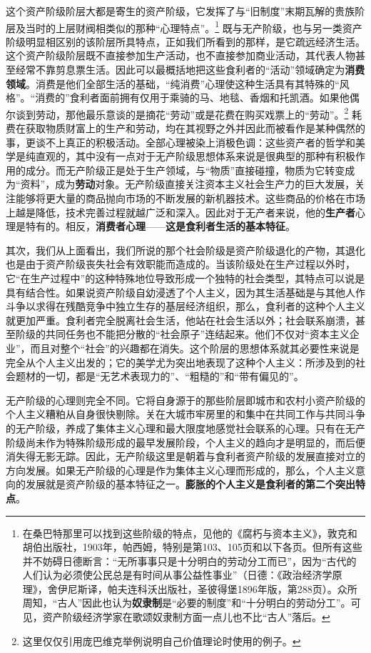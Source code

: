 \documentclass[fontset=fandol, a4paper, 12pt, openright]{ctexbook}
\begin{document}
这个资产阶级阶层大都是寄生的资产阶级，它发挥了与“旧制度”末期瓦解的贵族阶层及当时的上层财阀相类似的那种“心理特点”。\footnote{在桑巴特那里可以找到这些阶级的特点，见他的《腐朽与资本主义》，敦克和胡伯出版社，1903年，帕西姆，特别是第103、105页和以下各页。但所有这些并不妨碍日德断言：“无所事事只是十分明白的劳动分工而已”，因为“古代的人们认为必须使公民总是有时间从事公益性事业”（日德：《政治经济学原理》，舍伊尼斯译，帕夫连科沃出版社，圣彼得堡1896年版，第288页）。众所周知，“古人”因此也认为\textbf{奴隶制}是“必要的制度”和“十分明白的劳动分工”。可见，资产阶级经济学家在歌颂奴隶制方面一点儿也不比“古人”落后。} 既与无产阶级，也与另一类资产阶级明显相区别的该阶层所具特点，正如我们所看到的那样，是它疏远经济生活。这个资产阶级阶层既不直接参加生产活动，也不直接参加商业活动，其代表人物甚至经常不靠剪息票生活。因此可以最概括地把这些食利者的“活动”领域确定为\textbf{消费领域}。消费是他们全部生活的基础，“纯消费”心理使这种生活具有其特殊的“风格”。“消费的”食利者面前拥有仅用于乘骑的马、地毯、香烟和托凯酒。如果他偶尔谈到劳动，那他最乐意谈的是摘花“劳动”或是花费在购买戏票上的“劳动”。\footnote{这里仅仅引用庞巴维克举例说明自己价值理论时使用的例子。} 耗费在获取物质财富上的生产和劳动，均在其视野之外并因此而被看作是某种偶然的事，更谈不上真正的积极活动。全部心理被染上消极色调：这些资产者的哲学和美学是纯直观的，其中没有一点对于无产阶级思想体系来说是很典型的那种有积极作用的成分。而无产阶级正是处于生产领域，与“物质”直接碰撞，物质为它转变成为“资料”，成为\textbf{劳动}对象。无产阶级直接关注资本主义社会生产力的巨大发展，关注能够将更大量的商品抛向市场的不断发展的新机器技术。这些商品的价格在市场上越是降低，技术完善过程就越广泛和深入。因此对于无产者来说，他的\textbf{生产者}心理是特有的。相反，\textbf{消费者心理}——\textbf{这是食利者生活的基本特征}。

其次，我们从上面看出，我们所说的那个社会阶级是资产阶级退化的产物，其退化也是由于资产阶级丧失社会有效职能而造成的。当该阶级处在生产过程以外时，它“在生产过程中”的这种特殊地位导致形成一个独特的社会类型，其特点可以说是具有结合性。如果说资产阶级自幼浸透了个人主义，因为其生活基础是与其他人作斗争以求得在残酷竞争中独立生存的基层经济组织，那么，食利者的这种个人主义就更加严重。食利者完全脱离社会生活，他站在社会生活以外；社会联系崩溃，甚至阶级的共同任务也不能把分散的“社会原子”连结起来。他们不仅对“资本主义企业”，而且对整个“社会”的兴趣都在消失。这个阶层的思想体系就其必要性来说是完全从个人主义出发的；它的美学尤为突出地表现了这种个人主义：所涉及到的社会题材的一切，都是“无艺术表现力的”、“粗糙的”和“带有偏见的”。

无产阶级的心理则完全不同。它将自身源于的那些阶层即城市和农村小资产阶级的个人主义糟粕从自身很快剔除。关在大城市牢房里的和集中在共同工作与共同斗争的无产阶级，养成了集体主义心理和最大限度地感觉社会联系的心理。只有在无产阶级尚未作为特殊阶级形成的最早发展阶段，个人主义的趋向才是明显的，而后便消失得无影无踪。因此，无产阶级这里是朝着与食利者资产阶级的发展直接对立的方向发展。如果无产阶级的心理是作为集体主义心理而形成的，那么，个人主义意向的发展就是资产阶级的基本特征之一。\textbf{膨胀的个人主义是食利者的第二个突出特点}。
\end{document}
